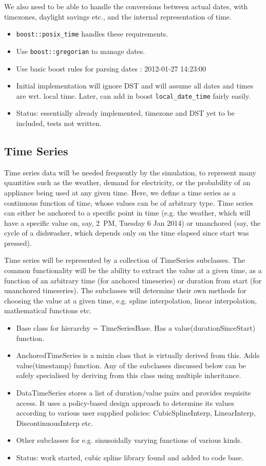 \documentclass[12pt]{article}
\newcommand{\itm}[1]{\begin{itemize}#1\end{itemize}}
\begin{document}
We also need to be able to handle the conversions between actual dates, with timezones, daylight savings etc., and the internal representation of time.

\itm{
	\item \texttt{boost::posix\_time} handles these requirements.
	\item Use \texttt{boost::gregorian} to manage dates.
	\item Use basic boost rules for parsing dates : 2012-01-27 14:23:00
	\item Initial implementation will ignore DST and will assume all dates and times are wrt. local time. Later, can add in boost \texttt{local\_date\_time} fairly easily.
	\item Status: essentially already implemented, timezone and DST yet to be included, tests not written.
}


\subsection{Time Series}
Time series data will be needed frequently by the simulation, to represent many quantities such as the weather, demand for electricity, or the probability of an appliance being used at any given time. Here, we define a time series as a continuous function of time, whose values can be of arbitrary type. Time series can either be anchored to a specific point in time (e.g.  the weather, which will have a specific value on, say, 2~PM, Tuesday 6 Jan 2014) or unanchored (say, the cycle of a dishwasher, which depends only on the time elapsed since start was pressed).

Time series will be represented by a collection of TimeSeries subclasses. The common functionality will be the ability to extract the value at a given time, as a function of an arbitrary time (for anchored timeseries) or duration from start (for unanchored timeseries). The subclasses will determine their own methods for choosing the value at a given time, e.g. spline interpolation, linear interpolation, mathematical functions etc.

\itm{
	\item Base class for hierarchy = TimeSeriesBase. Has a value(durationSinceStart) function.
	\item AnchoredTimeSeries is a mixin class that is virtually derived from this. Adds value(timestamp) function. Any of the subclasses discussed below can be safely specialised by deriving from this class using multiple inheritance.
	\item DataTimeSeries stores a list of duration/value pairs and provides requisite access. It uses a policy-based design approach to determine its values according to various user supplied policies: CubicSplineInterp, LinearInterp, DiscontinuousInterp etc.
	\item Other subclasses for e.g. sinusoidally varying functions of various kinds.
	\item Status: work started, cubic spline library found and added to code base.
}
\end{document}
